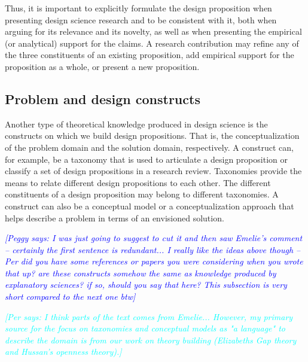 \documentclass[graybox]{svmult}
\newcommand{\emelie}[1]{\textcolor{red}{{\it [Emelie says: #1]}}}
\newcommand{\peggy}[1]{\textcolor{blue}{{\it [Peggy says: #1]}}}
\newcommand{\per}[1]{\textcolor{cyan}{{\it [Per says: #1]}}}
\newcommand{\emelie}[1]{}
\newcommand{\peggy}[1]{}
\newcommand{\per}[1]{}
\begin{document}
Thus, it is important to explicitly formulate the design proposition when presenting design science research and to be consistent with it, both when arguing for its relevance and its novelty, as well as when presenting the empirical (or analytical) support for the claims. A research contribution may refine any of the three constituents of an existing proposition, add empirical support for the proposition as a whole, or present a new proposition.




\subsection{Problem and design constructs}
\label{sec:constructs}
Another type of theoretical knowledge produced in design science is the 
constructs on which we build design propositions. That is, the conceptualization of the problem domain and the solution domain, respectively.  
A construct can, for example, be a taxonomy that is used to articulate a design proposition or classify a set of design propositions in a research review. 
Taxonomies provide the means to relate different design propositions to each other. The different constituents of a design proposition may belong to different taxonomies. A construct can also be a conceptual model or a conceptualization approach that helps describe a problem in terms of an envisioned solution.

\peggy{I was just going to suggest to cut it and then saw Emelie's comment -- certainly the first sentence is redundant...  I really like the ideas above though -- Per did you have some references or papers you were considering when you wrote that up? are these constructs somehow the same as knowledge produced by explanatory sciences? if so, should you say that here?  This subsection is very short compared to the next one btw}

\per{I think parts of the text comes from Emelie... However, my primary source for the focus on taxonomies and conceptual models as "a language" to describe the domain is from our work on theory building (Elizabeths Gap theory and Hussan's openness theory).}
\end{document}
